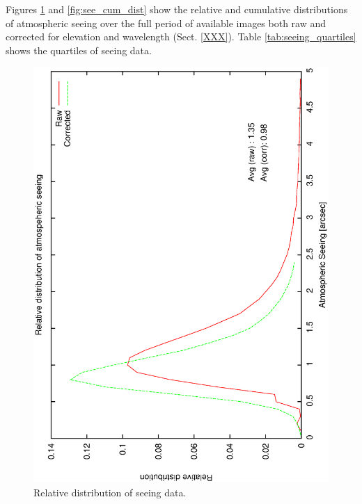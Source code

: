 {{Figures \ref{fig:see_dist} and \ref{fig:see_cum_dist} show the relative and cumulative distributions of atmospheric seeing over the full period of available images both raw and corrected for elevation and wavelength (Sect. \ref{XXX}). Table \ref{tab:seeing_quartiles} shows the quartiles of seeing data. 
\begin{figure}[htbp]
\begin{center}
    \includegraphics[scale=0.4, angle=-90]{figures/ecs/seeing_dist.eps}
\end{center} 
\caption[Relative distribution of seeing data.]
{Relative distribution of seeing data.}
\label{fig:see_dist}
\end{figure}

}}
